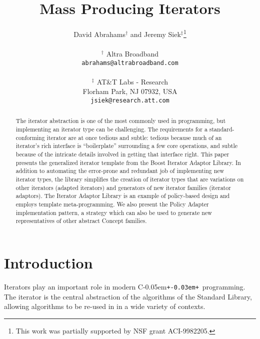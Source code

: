 \documentclass{netobjectdays}
\newcommand{\Cpp}{C\kern-0.05em\texttt{+\kern-0.03em+}}
\begin{document}
\title{Mass Producing Iterators}

\author{David Abrahams$^\dag$ and Jeremy Siek$^\ddag$\thanks{This work
was partially supported by NSF grant ACI-9982205.} \\
\\
$^\dag$ Altra Broadband \\
\texttt{abrahams@altrabroadband.com}\\
\\
$^\ddag$ AT\&T Labs - Research \\
Florham Park, NJ 07932, USA \\
\texttt{jsiek@research.att.com}
}

\maketitle

 \begin{abstract} $\!$The iterator abstraction is one of the most
commonly used in programming, but implementing an iterator type can be
challenging. The requirements for a standard-conforming iterator are
at once tedious and subtle: tedious because much of an iterator's rich
interface is ``boilerplate'' surrounding a few core operations, and
subtle because of the intricate details involved in getting that
interface right. This paper presents the generalized iterator template
from the Boost Iterator Adaptor Library. In addition to automating the
error-prone and redundant job of implementing new iterator types, the
library simplifies the creation of iterator types that are variations
on other iterators (adapted iterators) and generators of new iterator
families (iterator adaptors). The Iterator Adaptor Library is an
example of policy-based design and employs template
meta-programming. We also present the Policy Adapter implementation
pattern, a strategy which can also be used to generate new
representatives of other abstract Concept families.
\end{abstract}


\section{Introduction}


Iterators play an important role in modern \Cpp\ programming. The
iterator is the central abstraction of the algorithms of the Standard
Library, allowing algorithms to be re-used in in a wide variety of
contexts. 
\end{document}
